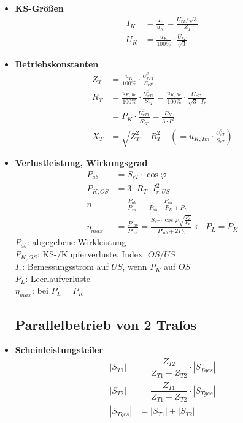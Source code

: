 \begin{itemize}
    \item[]{\textbf{KS-Größen}}
    \begin{align*}
    I_K &= \frac{I_r}{u_K} = \frac{U_{rT}/\sqrt{3}}{Z_T}\\
    U_K &= \frac{u_K}{100\%} \cdot \frac{U_{rT}}{\sqrt{3}}
    \end{align*}

    \item[]{\textbf{Betriebskonstanten}}
    \begin{align*}
    Z_T &= \frac{u_K}{100\%} \cdot \frac{U^2_{rT1}}{S_{rT}} \\
    R_T &= \frac{u_{K,Re}}{100\%} \cdot \frac{U^2_{rT1}}{S_{rT}} =
         \frac{u_{K,Re}}{100\%} \cdot \frac{U_{rT1}}{\sqrt{3}\cdot I_r}\\
        &= P_K \cdot \frac{U^2_{rT1}}{S^2_{rT}} = \frac{P_K}{3\cdot I^2_r}\\
    X_T &= \sqrt{Z^2_T - R^2_T} \quad \left(= u_{K,Im} \cdot \frac{U^2_{rT}}{S_{rT}} \right)
    \end{align*}

    \item[]{\textbf{Verlustleistung, Wirkungsgrad}}
\begin{align*}
    P_{ab} &= S_{rT} \cdot \cos \varphi\\
    P_{K,OS} &= 3 \cdot R_T \cdot I^2_{r,US}\\
    \eta &= \frac{P_{ab}}{P_{zu}} = \frac{P_{ab}}{P_{ab}+P_K+P_L}\\
    \eta_{max} &= \frac{P'_{ab}}{P'_{zu}} = \frac{S_{rT}\cdot \cos \varphi \sqrt{\frac{P_L}{P_K}}}{P'_{ab} + 2 P_L} \leftarrow P_L = P_K
\end{align*}
$P_{ab}$: abgegebene Wirkleistung\\
$P_{K,OS}$: KS-/Kupferverluste, Index: $OS/US$\\
$I_r$: Bemessungsstrom auf $US$, wenn $P_K$ auf $OS$ \\
$P_L$: Leerlaufverluste\\
$\eta_{max}$: bei $P_L = P_K$


\subsection{Parallelbetrieb von 2 Trafos}
\item[] \textbf{Scheinleistungsteiler}
\begin{align*}
    |S_{T1}| &= \dfrac{Z_{T2}}{Z_{T1} + Z_{T2}} \cdot |S_{Tges}|\\
    |S_{T2}| &= \dfrac{Z_{T1}}{Z_{T1} + Z_{T2}} \cdot |S_{Tges}|\\
    |S_{Tges}| &= |S_{T1}| + |S_{T2}|\\
\end{align*}


\end{itemize}
